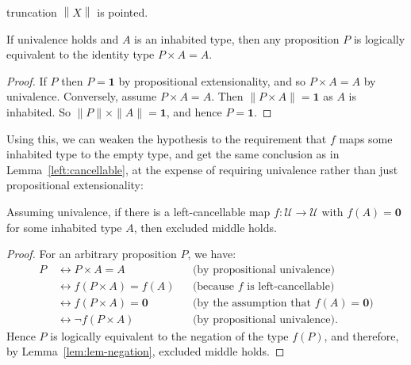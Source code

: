 \documentclass[a4paper,UKenglish]{lipics-v2016}
\newcommand{\UU}{\mathcal{U}}
\newcommand{\Empty}{\mathbf{0}}
\newcommand{\unit}{\mathbf{1}}
\begin{document}
truncation $\left\| X \right\|$ is
pointed.  %
\begin{lemma}\label{lem:prop-equivalent}
  If univalence holds and $A$ is an inhabited type, then any
  proposition $P$ is logically equivalent to the identity type
  $P \times A = A$.
\end{lemma}
\begin{proof}
  If $P$ then $P=\unit$ by propositional extensionality, and so
  $P\times A=A$ by univalence.  Conversely, assume $P \times A = A$.
  Then $\|P \times A\| = \unit$ as $A$ is inhabited.  So
  $\|P\|\times\|A\|=\unit$, and hence $P=\unit$.
\end{proof}
Using this, we can weaken the hypothesis to the requirement that $f$
maps some inhabited type to the empty type, and get the same
conclusion as in Lemma~\ref{left:cancellable}, at the expense of
requiring univalence rather than just propositional extensionality:
\begin{lemma} \label{left:cancellable:bis} Assuming univalence, if
  there is a left-cancellable map $f: \UU \to \UU$ with
  $f(A)=\Empty$ for some inhabited type $A$, then excluded middle holds.
\end{lemma}
\begin{proof}
  For an arbitrary proposition $P$, we have:
  \begin{align*}
    P \,\!& \leftrightarrow  P \times A = A \quad
    && \mbox{(by propositional univalence)}
    \\
        &\leftrightarrow  f(P \times A)=f(A)
    && \mbox{(because $f$ is left-cancellable)}
    \\
        &\leftrightarrow f(P \times A)=\Empty
    && \mbox{(by the assumption that $f(A)=\Empty$)}
    \\
        &\leftrightarrow \neg f(P \times A)
          && \mbox{(by propositional univalence).}
  \end{align*}
  Hence $P$ is logically equivalent to the negation of the type
  $f(P)$, and therefore, by Lemma~\ref{lem:lem-negation}, excluded
  middle holds.
\end{proof}
\end{document}
